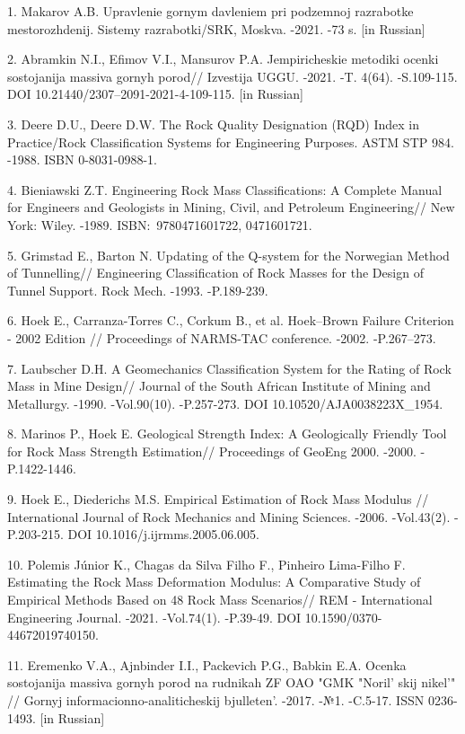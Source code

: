 \begin{refs}
1. Makarov A.B. Upravlenie gornym davleniem pri podzemnoj razrabotke
mestorozhdenij. Sistemy razrabotki/SRK, Moskva. -2021. -73 s. {[}in
Russian{]}

2. Abramkin N.I., Efimov V.I., Mansurov P.A. Jempiricheskie metodiki
ocenki sostojanija massiva gornyh porod// Izvestija UGGU. -2021. -T.
4(64). -S.109-115. DOI 10.21440/2307--2091-2021-4-109-115. {[}in
Russian{]}

3. Deere D.U., Deere D.W. The Rock Quality Designation (RQD) Index in
Practice/Rock Classification Systems for Engineering Purposes. ASTM STP
984. -1988. ISBN 0-8031-0988-1.

4. Bieniawski Z.T. Engineering Rock Mass Classifications: A Complete
Manual for Engineers and Geologists in Mining, Civil, and Petroleum
Engineering// New York: Wiley. -1989. ISBN:~9780471601722, 0471601721.

5. Grimstad E., Barton N. Updating of the Q-system for the Norwegian
Method of Tunnelling// Engineering Classification of Rock Masses for the
Design of Tunnel Support. Rock Mech. -1993. -P.189-239.

6. Hoek E., Carranza-Torres C., Corkum B., et al. Hoek--Brown Failure
Criterion - 2002 Edition // Proceedings of NARMS-TAC conference. -2002.
-P.267--273.

7. Laubscher D.H. A Geomechanics Classification System for the Rating of
Rock Mass in Mine Design// Journal of the South African Institute of
Mining and Metallurgy. -1990. -Vol.90(10). -P.257-273. DOI
10.10520/AJA0038223X\_1954.

8. Marinos P., Hoek E. Geological Strength Index: A Geologically Friendly
Tool for Rock Mass Strength Estimation// Proceedings of GeoEng 2000.
-2000. -P.1422-1446.

9. Hoek E., Diederichs M.S. Empirical Estimation of Rock Mass Modulus //
International Journal of Rock Mechanics and Mining Sciences. -2006.
-Vol.43(2). -P.203-215. DOI 10.1016/j.ijrmms.2005.06.005.

10. Polemis Júnior K., Chagas da Silva Filho F., Pinheiro Lima-Filho F.
Estimating the Rock Mass Deformation Modulus: A Comparative Study of
Empirical Methods Based on 48 Rock Mass Scenarios// REM - International
Engineering Journal. -2021. -Vol.74(1). -P.39-49. DOI
10.1590/0370-44672019740150.

11. Eremenko V.A., Ajnbinder I.I., Packevich P.G., Babkin E.A. Ocenka
sostojanija massiva gornyh porod na rudnikah ZF OAO "GMK
"Noril' skij nikel'" // Gornyj
informacionno-analiticheskij bjulleten'. -2017. -№1.
-C.5-17. ISSN 0236-1493. {[}in Russian{]}


\end{refs}
